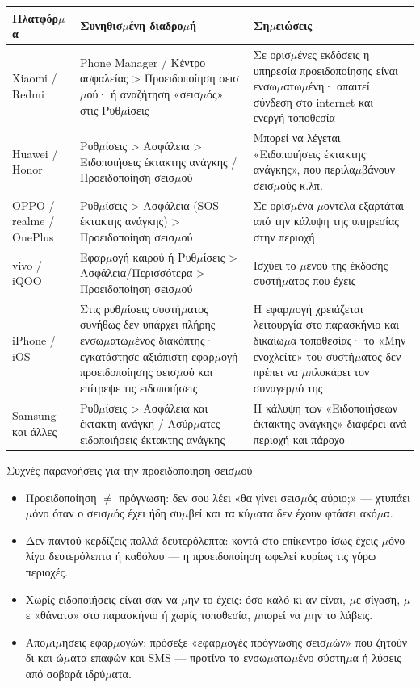 \begin{center}
\begin{tabularx}{\linewidth}{|X|X|X|}
\hline
\textbf{Πλατφόρ$\mu$α} & \textbf{Συνηθισ$\mu$ένη διαδρο$\mu$ή} & \textbf{Ση$\mu$ειώσεις} \tabularnewline
\hline
Xiaomi / Redmi & Phone Manager / Κέντρο ασφαλείας > Προειδοποίηση σεισ$\mu$ού· ή αναζήτηση «σεισ$\mu$ός» στις Ρυθ$\mu$ίσεις & Σε ορισ$\mu$ένες εκδόσεις η υπηρεσία προειδοποίησης είναι ενσω$\mu$ατω$\mu$ένη· απαιτεί σύνδεση στο internet και ενεργή τοποθεσία \tabularnewline
Huawei / Honor & Ρυθ$\mu$ίσεις > Ασφάλεια > Ειδοποιήσεις έκτακτης ανάγκης / Προειδοποίηση σεισ$\mu$ού & Μπορεί να λέγεται «Ειδοποιήσεις έκτακτης ανάγκης», που περιλα$\mu$βάνουν σεισ$\mu$ούς κ.λπ. \tabularnewline
OPPO / realme / OnePlus & Ρυθ$\mu$ίσεις > Ασφάλεια (SOS έκτακτης ανάγκης) > Προειδοποίηση σεισ$\mu$ού & Σε ορισ$\mu$ένα $\mu$οντέλα εξαρτάται από την κάλυψη της υπηρεσίας στην περιοχή \tabularnewline
vivo / iQOO & Εφαρ$\mu$ογή καιρού ή Ρυθ$\mu$ίσεις > Ασφάλεια/Περισσότερα > Προειδοποίηση σεισ$\mu$ού & Ισχύει το $\mu$ενού της έκδοσης συστή$\mu$ατος που έχεις \tabularnewline
iPhone / iOS & Στις ρυθ$\mu$ίσεις συστή$\mu$ατος συνήθως δεν υπάρχει πλήρης ενσω$\mu$ατω$\mu$ένος διακόπτης· εγκατάστησε αξιόπιστη εφαρ$\mu$ογή προειδοποίησης σεισ$\mu$ού και επίτρεψε τις ειδοποιήσεις & Η εφαρ$\mu$ογή χρειάζεται λειτουργία στο παρασκήνιο και δικαίω$\mu$α τοποθεσίας· το «Μην ενοχλείτε» του συστή$\mu$ατος δεν πρέπει να $\mu$πλοκάρει τον συναγερ$\mu$ό της \tabularnewline
Samsung και άλλες & Ρυθ$\mu$ίσεις > Ασφάλεια και έκτακτη ανάγκη / Ασύρ$\mu$ατες ειδοποιήσεις έκτακτης ανάγκης & Η κάλυψη των «Ειδοποιήσεων έκτακτης ανάγκης» διαφέρει ανά περιοχή και πάροχο \tabularnewline
\hline
\end{tabularx}
\end{center}

\begin{tcbwarn}{Συχνές παρανοήσεις για την προειδοποίηση σεισ$\mu$ού}
\begin{itemize}
  \item Προειδοποίηση $\neq$ πρόγνωση: δεν σου λέει «θα γίνει σεισ$\mu$ός αύριο;» — χτυπάει $\mu$όνο όταν ο σεισ$\mu$ός έχει ήδη συ$\mu$βεί και τα κύ$\mu$ατα δεν έχουν φτάσει ακό$\mu$α.
  \item Δεν παντού κερδίζεις πολλά δευτερόλεπτα: κοντά στο επίκεντρο ίσως έχεις $\mu$όνο λίγα δευτερόλεπτα ή καθόλου — η προειδοποίηση ωφελεί κυρίως τις γύρω περιοχές.
  \item Χωρίς ειδοποιήσεις είναι σαν να $\mu$ην το έχεις: όσο καλό κι αν είναι, $\mu$ε σίγαση, $\mu$ε «θάνατο» στο παρασκήνιο ή χωρίς τοποθεσία, $\mu$πορεί να $\mu$ην το λάβεις.
  \item Απο$\mu$ι$\mu$ήσεις εφαρ$\mu$ογών: πρόσεξε «εφαρ$\mu$ογές πρόγνωσης σεισ$\mu$ών» που ζητούν δι και ώ$\mu$ατα επαφών και SMS — προτίνα το ενσω$\mu$ατω$\mu$ένο σύστη$\mu$α ή λύσεις από σοβαρά ιδρύ$\mu$ατα.
\end{itemize}

\end{tcbwarn}

